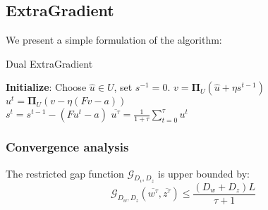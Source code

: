 \subsection*{ExtraGradient}
We present a simple formulation of the algorithm:
\begin{algorithm}
  \caption{Dual ExtraGradient}
  \label{alg:extra}
\begin{algorithmic}
  \STATE \textbf{Initialize}: Choose $\hat{ u} \in {U}$, set $ s^{-1} = 0$.
  \STATE $ v = \mathbf{\Pi}_{{U}}(\hat{ u} + \eta  s^{t-1})$\\
  \STATE $ u^t = \mathbf{\Pi}_{{U}}( v - \eta ( F  v -  a))$\\
  \STATE $ s^t =   s^{t-1} - ( F  u^t -  a)$
  \ENDFOR
  \RETURN $\overline{ u^{\tau}} = \frac{1}{1 + \tau} \sum_{t=0}^{\tau}  u^t$
\end{algorithmic}
\end{algorithm}
\subsubsection*{Convergence analysis}
The restricted gap function
$\mathcal{G}_{D_{ v}, D_{ z}}$ is upper bounded by:
\begin{equation}
  \mathcal{G}_{D_{ w}, D_{ z}}(\overline{ w^{\tau}},
\overline{ z^{\tau}}) \leq \frac{\left( D_{ w} + D_{ z} \right)
L}{\tau + 1}
\label{eq:ub}
\end{equation}

